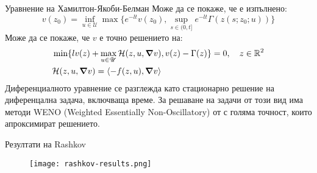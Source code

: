 \begin{frame}[t]{Уравнение на Хамилтон-Якоби-Белман}
  Може да се покаже, че е изпълнено:
  \begin{equation}
    v(z_0) = \inf_{u \in \mathscr{U}} \max\{e^{-lt} v(z_0), \sup_{s \in (0, t]} e^{-lt} \Gamma(z(s; z_0; u))\}
  \end{equation}
  Може да се покаже, че $v$ е точно решението на:
  \begin{equation}
    \begin{split}
      &\min\{l v(z) + \max_{u \in \mathscr{U}} \mathcal{H}(z, u, \grad{v}), v(z) - \Gamma(z) \} = 0, \quad z \in \mathbb{R}^2 \\
      &\mathcal{H}(z, u, \grad{v}) = \langle -f(z, u), \grad{v} \rangle
    \end{split}
  \end{equation}
  Диференциалното уравнение се разглежда като стационарно решение на диференцална задача, включваща време.
  За решаване на задачи от този вид има методи WENO (Weighted Essentially Non-Oscillatory) от с голяма точност, които апроксимират решението.
\end{frame}

\begin{frame}[t]{Резултати на Rashkov}
  \begin{figure}
    \texttt{[image: rashkov-results.png]}
  \end{figure}
\end{frame}
